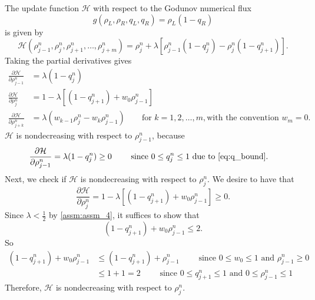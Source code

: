 The update function $\mathcal{H}$ with respect to the Godunov numerical flux
\[
    g(\rho_L,\rho_R,q_L,q_R)= \rho_L (1-q_R)
\]
is given by
\begin{equation}\label{eq:mono_H}
    \mathcal{H}( \rho_{j-1}^n, \rho_{j}^n,  \rho_{j+1}^n,\dots,  \rho_{j+m}^n)
    =
    \rho_j^n
    +
    \lambda
    \left[
        \rho_{j-1}^n(1-q_j^n)
        -
        \rho_j^n(1-q_{j+1}^n)
        \right].
\end{equation}
Taking the partial derivatives gives
\begin{align*}
    \frac{\partial \mathcal{H}}{\partial \rho_{j-1}^n} & =\lambda(1-q_j^n)                                                                                                              \\
    \frac{\partial \mathcal{H}}{\partial \rho_j^n}     & =1-\lambda\left[(1-q_{j+1}^n)+w_0\rho_{j-1}^n\right]                                                                           \\
    \frac{\partial \mathcal{H}}{\partial \rho_{j+k}^n} & = \lambda\left( w_{k-1}\rho_j^n -w_k\rho_{j-1}^n\right) \qquad \text{for } k= 1,2,\dots,m, \text{with the convention $w_m=0$}.
\end{align*}
$\mathcal{H}$ is nondecreasing with respect to $\rho_{j-1}^n$, because
\begin{equation}\label{eq:First_argument}
    \begin{split}
        \frac{\partial \mathcal{H}}{\partial \rho_{j-1}^n} & =\lambda(1-q_j^n) \geq 0 \qquad \text{ since $0 \leq q_{j}^{n} \leq 1$ due to } \eqref{eq:q_bound}.
    \end{split}
\end{equation}
Next, we check if $\mathcal{H}$ is nondecreasing with respect to $\rho_{j}^n$. We desire to have that
\[
    \frac{\partial \mathcal{H}}{\partial \rho_j^n}
    =
    1-\lambda\left[(1-q_{j+1}^n)+w_0\rho_{j-1}^n\right] \geq 0.
\]
Since $\lambda < \frac{1}{2}$ by \ref{assm:assm_4}, it suffices to show that
\[
    (1-q_{j+1}^n)+w_0\rho_{j-1}^n\leq 2.
\]
So
\begin{align*}
    (1-q_{j+1}^n)+w_0\rho_{j-1}^n & \leq (1-q_{j+1}^n)+\rho_{j-1}^n   \qquad \text{ since $0\leq w_0 \leq 1$ and $\rho_{j-1}^n \geq 0$ } \\
                                  & \leq 1+1 = 2 \qquad \text{ since $0\leq q_{j+1}^n \leq 1$ and $0 \leq \rho_{j-1}^n \leq 1$ }
\end{align*}
Therefore, $\mathcal{H}$ is nondecreasing with respect to $\rho_{j}^n$.


